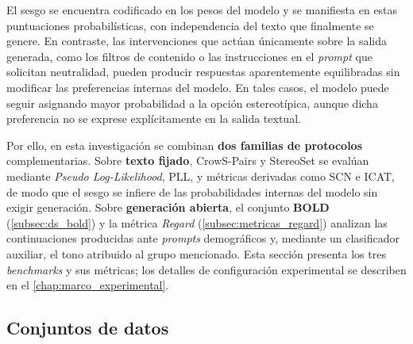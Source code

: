\documentclass[12pt,a4paper]{report}
\begin{document}
El sesgo se encuentra codificado en los pesos del modelo y se manifiesta en estas puntuaciones probabilísticas, con independencia del texto que finalmente se genere. En contraste, las intervenciones que actúan únicamente sobre la salida generada, como los filtros de contenido o las instrucciones en el \emph{prompt} que solicitan neutralidad, pueden producir respuestas aparentemente equilibradas sin modificar las preferencias internas del modelo. En tales casos, el modelo puede seguir asignando mayor probabilidad a la opción estereotípica, aunque dicha preferencia no se exprese explícitamente en la salida textual.

Por ello, en esta investigación se combinan \textbf{dos familias de protocolos} complementarias. Sobre \textbf{texto fijado}, CrowS-Pairs y StereoSet se evalúan mediante \emph{Pseudo Log-Likelihood}, PLL, y métricas derivadas como SCN e ICAT, de modo que el sesgo se infiere de las probabilidades internas del modelo sin exigir generación. Sobre \textbf{generación abierta}, el conjunto \textbf{BOLD} (\autoref{subsec:ds_bold}) y la métrica \textit{Regard} (\autoref{subsec:metricas_regard}) analizan las continuaciones producidas ante \textit{prompts} demográficos y, mediante un clasificador auxiliar, el tono atribuido al grupo mencionado. Esta sección presenta los tres \textit{benchmarks} y sus métricas; los detalles de configuración experimental se describen en el \autoref{chap:marco_experimental}.

\subsection{Conjuntos de datos}
\label{sec:datasets_teorico}
\end{document}
